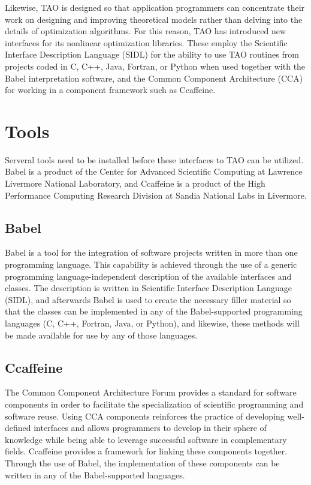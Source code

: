 \documentclass[doublespacing,12pt]{article}
\begin{document}
Likewise, TAO is designed so that application programmers can
concentrate their work on designing and improving theoretical models
rather than delving into the details of optimization algorithms.  For
this reason, TAO has introduced new interfaces for its nonlinear
optimization libraries.  These employ the Scientific Interface
Description Language (SIDL) for the ability to use TAO routines
from projects coded in C, C++, Java, Fortran, or Python when used
together with the Babel\cite{babel} interpretation software, and the
Common Component Architecture\cite{cca} (CCA) for working in a
component framework such as Ccaffeine\cite{ccaffeine}.


\section{Tools}
Serveral tools need to be installed before these
interfaces to TAO can be utilized.  Babel is a product of the
Center for Advanced Scientific Computing at Lawrence Livermore
National Laboratory, and Ccaffeine is a product of the High
Performance Computing Research Division at Sandia National Labs 
in Livermore.


\subsection{Babel}\label{sec:babel}
Babel is a tool for the integration of software projects written in
more than one programming language.  This capability is achieved
through the use of a generic 
programming language-independent description of the available interfaces
and classes.  The description is written in Scientific Interface
Description Language (SIDL), and afterwards Babel is used to create
the necessary filler material so that the classes can be implemented
in any of the Babel-supported programming languages (C, C++, Fortran,
Java, or Python), and likewise, these methods will be made available
for use by any of those languages.

\subsection{Ccaffeine}
The Common Component Architecture Forum provides a standard for software
components in order to facilitate the specialization of scientific programming
and software reuse.  Using CCA components reinforces the practice of
developing well-defined interfaces and allows programmers to develop 
in their sphere of knowledge while being able to leverage successful
software in complementary fields.  Ccaffeine provides a framework for
linking these components together.  Through the use of Babel, the
implementation of these components can be written in any of the
Babel-supported languages.
\end{document}

